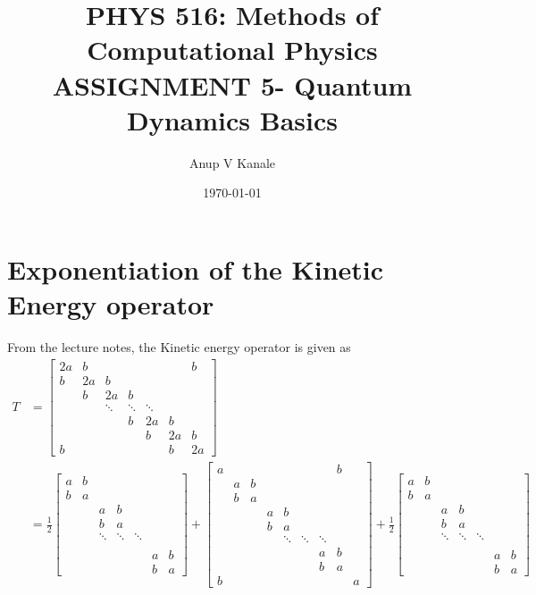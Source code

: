 \documentclass[11pt, oneside]{article}   	%
\title{\vspace{-6ex}\large PHYS 516: Methods of Computational Physics \\
  \normalsize ASSIGNMENT 5- Quantum Dynamics Basics\vspace{-3ex}}
\author{Anup V Kanale}
\date{\vspace{-3ex}\today}							%
\begin{document}
\vspace{-6ex}\maketitle
\section{Exponentiation of the Kinetic Energy operator}
From the lecture notes, the Kinetic energy operator is given as
\begin{align}
T &= \left[
\begin{array}{ccccccccc}
2a & b & & & & & b\\
b & 2a & b \\
  & b & 2a & b \\
  &  & \ddots & \ddots & \ddots \\
 & &  & b & 2a & b \\
 & &  &  & b & 2a & b \\
b & &  &  &   & b & 2a
\end{array}\right] \\
&= \frac{1}{2} \left[
\begin{array}{ccccccccc}
a & b & & & & & \\
b & a &  \\
  &  & a & b \\
    &  & b & a \\
  &  & \ddots & \ddots & \ddots \\
 & &  &  &  &  \\
 & &  &  &  & a & b \\
 & &  &  &   & b & a
\end{array}\right] +
\left[
\begin{array}{ccccccccc}
a & & & & & & & b \\
& a & b & & & & & \\
& b & a &  \\
  & & & a & b \\
   & &  & b & a \\
 & & & & \ddots & \ddots & \ddots \\
& & &  &  &  & a & b \\
& & &  &  &   & b & a \\
b & & &  &  &   &  & & a
\end{array}\right] +
\frac{1}{2} \left[
\begin{array}{ccccccccc}
a & b & & & & & \\
b & a &  \\
  &  & a & b \\
    &  & b & a \\
  &  & \ddots & \ddots & \ddots \\
 & &  &  &  &  \\
 & &  &  &  & a & b \\
 & &  &  &   & b & a
\end{array}\right]
\end{align}
\end{document}
